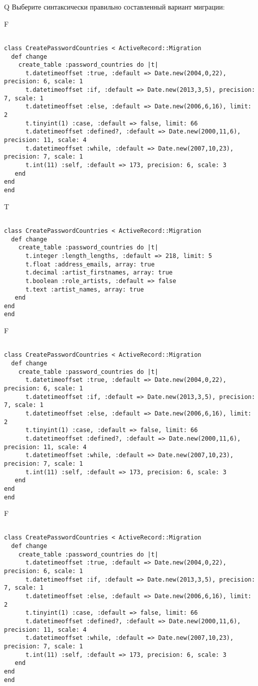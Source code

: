 Q
Выберите синтаксически правильно составленный вариант миграции:

F
\begin{verbatim}
		
class CreatePasswordCountries < ActiveRecord::Migration 
  def change 
    create_table :password_countries do |t| 
      t.datetimeoffset :true, :default => Date.new(2004,0,22), precision: 6, scale: 1
      t.datetimeoffset :if, :default => Date.new(2013,3,5), precision: 7, scale: 1
      t.datetimeoffset :else, :default => Date.new(2006,6,16), limit: 2
      t.tinyint(1) :case, :default => false, limit: 66
      t.datetimeoffset :defined?, :default => Date.new(2000,11,6), precision: 11, scale: 4
      t.datetimeoffset :while, :default => Date.new(2007,10,23), precision: 7, scale: 1
      t.int(11) :self, :default => 173, precision: 6, scale: 3
   end
end
end
\end{verbatim}

T
\begin{verbatim}
		
class CreatePasswordCountries < ActiveRecord::Migration 
  def change 
    create_table :password_countries do |t| 
      t.integer :length_lengths, :default => 218, limit: 5
      t.float :address_emails, array: true
      t.decimal :artist_firstnames, array: true
      t.boolean :role_artists, :default => false
      t.text :artist_names, array: true
   end
end
end
\end{verbatim}

F
\begin{verbatim}
		
class CreatePasswordCountries < ActiveRecord::Migration 
  def change 
    create_table :password_countries do |t| 
      t.datetimeoffset :true, :default => Date.new(2004,0,22), precision: 6, scale: 1
      t.datetimeoffset :if, :default => Date.new(2013,3,5), precision: 7, scale: 1
      t.datetimeoffset :else, :default => Date.new(2006,6,16), limit: 2
      t.tinyint(1) :case, :default => false, limit: 66
      t.datetimeoffset :defined?, :default => Date.new(2000,11,6), precision: 11, scale: 4
      t.datetimeoffset :while, :default => Date.new(2007,10,23), precision: 7, scale: 1
      t.int(11) :self, :default => 173, precision: 6, scale: 3
   end
end
end
\end{verbatim}

F
\begin{verbatim}
		
class CreatePasswordCountries < ActiveRecord::Migration 
  def change 
    create_table :password_countries do |t| 
      t.datetimeoffset :true, :default => Date.new(2004,0,22), precision: 6, scale: 1
      t.datetimeoffset :if, :default => Date.new(2013,3,5), precision: 7, scale: 1
      t.datetimeoffset :else, :default => Date.new(2006,6,16), limit: 2
      t.tinyint(1) :case, :default => false, limit: 66
      t.datetimeoffset :defined?, :default => Date.new(2000,11,6), precision: 11, scale: 4
      t.datetimeoffset :while, :default => Date.new(2007,10,23), precision: 7, scale: 1
      t.int(11) :self, :default => 173, precision: 6, scale: 3
   end
end
end
\end{verbatim}

